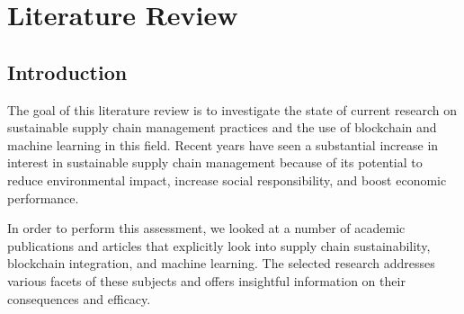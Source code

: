 
\chapter{Literature Review}\doublespacing %

\label{Chapter2} %



\section{Introduction}
\noindent The goal of this literature review is to investigate the state of current research on sustainable supply chain management practices and the use of blockchain and machine learning in this field. Recent years have seen a substantial increase in interest in sustainable supply chain management because of its potential to reduce environmental impact, increase social responsibility, and boost economic performance.
\par In order to perform this assessment, we looked at a number of academic publications and articles that explicitly look into supply chain sustainability, blockchain integration, and machine learning. The selected research addresses various facets of these subjects and offers insightful information on their consequences and efficacy.

